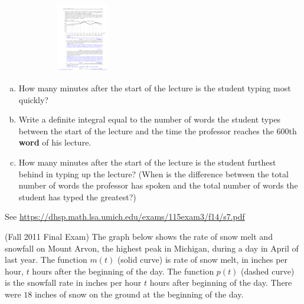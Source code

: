 \documentclass[11pt]{exam}
\begin{document}
\begin{questions}
\begin{center}
  \includegraphics[width=7cm,height=3cm]{Figures/fig2.pdf}
\end{center}
\begin{enumerate}[(a)]
	\item How many minutes after the start of the lecture is the student typing most quickly?
	\item Write a definite integral equal to the number of words the student types between the start of the lecture and the time the professor reaches the $600$th {\bf word} of his lecture. 
	\item How many minutes after the start of the lecture is the student furthest behind in typing up the lecture? (When is the difference between the total number of words the professor has spoken and the total number of words the student has typed the greatest?)
\end{enumerate}
\begin{solution}
  See \href{https://dhsp.math.lsa.umich.edu/exams/115exam3/f14/s7.pdf}{https://dhsp.math.lsa.umich.edu/exams/115exam3/f14/s7.pdf}
\end{solution}
\pagebreak
\question (Fall 2011 Final Exam)
The graph below shows the rate of snow melt and snowfall on Mount Arvon, the highest peak in Michigan, during a day in April of last year. The function $m(t)$ (solid curve) is rate of snow melt, in inches per hour, $t$ hours after the beginning of the day. The function $p(t)$ (dashed curve) is the snowfall rate in inches per hour $t$ hours after beginning of the day. There were $18$ inches of snow on the ground at the beginning of the day.


\end{questions}
\end{document}
